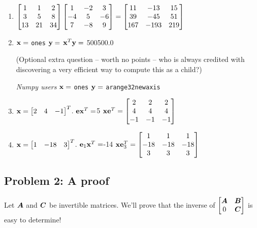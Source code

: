 \documentclass{article}
\begin{document}
\begin{enumerate}%
\item $\begin{bmatrix}  1 & 1 & 2 \\ 3 & 5 & 8 \\ 13 & 21 & 34  \end{bmatrix} \begin{bmatrix}  1 & -2 & 3 \\ -4 & 5 & -6 \\ 7 & -8 & 9 \end{bmatrix} =\begin{bmatrix} 11 & -13 & 15 \\ 39 & -45 & 51 \\ 167 & -193 & 219 \end{bmatrix}$



\item $\boldsymbol{\mathrm{x}} =$ {\colorbox[rgb]{1.00,0.93,1.00}{\tt ones}} $\boldsymbol{\mathrm{y}} =$ {\colorbox[rgb]{1.00,0.93,1.00}{\tt {}}} $\boldsymbol{\mathrm{x}}^T \boldsymbol{\mathrm{y}} =$ 500500.0

(Optional extra question --{} worth no points --{} who is always credited with discovering a very efficient way to compute this as a child?)

\emph{Numpy users} $\boldsymbol{\mathrm{x}} =$ {\colorbox[rgb]{1.00,0.93,1.00}{\tt ones}} $\boldsymbol{\mathrm{y}} =$ {\colorbox[rgb]{1.00,0.93,1.00}{\tt arange\char32newaxis}}


\item $\boldsymbol{\mathrm{x}} = \begin{bmatrix}  2 & 4 & -1 \end{bmatrix}^T$. \newline  $\boldsymbol{\mathrm{e}} \boldsymbol{\mathrm{x}}^T =$5 \newline  $\boldsymbol{\mathrm{x}} \boldsymbol{\mathrm{e}}^T =\begin{bmatrix} 2 & 2 & 2 \\ 4 & 4  &4 \\ -1 & -1 & -1  \end{bmatrix} $


\item $\boldsymbol{\mathrm{x}} = \begin{bmatrix} 1 & -18 & 3 \end{bmatrix}^T$. \newline  $\boldsymbol{\mathrm{e}}_1 \boldsymbol{\mathrm{x}}^T =$-14 \newline  $\boldsymbol{\mathrm{x}} \boldsymbol{\mathrm{e}}_3^T =\begin{bmatrix} 1& 1 & 1\\ -18 & -18& -18 \\ 3 & 3 & 3 \end{bmatrix} $



\end{enumerate}
\hypertarget{problem_2_a_proof_4}{}\subsection*{{Problem 2: A proof}}\label{problem_2_a_proof_4}

Let $\boldsymbol{A}$ and $\boldsymbol{C}$ be invertible matrices. We'{}ll prove that the inverse of $\begin{bmatrix}  \boldsymbol{A} & \boldsymbol{B} \\ 0 & \boldsymbol{C}  \end{bmatrix}$ is easy to determine!
\end{document}
